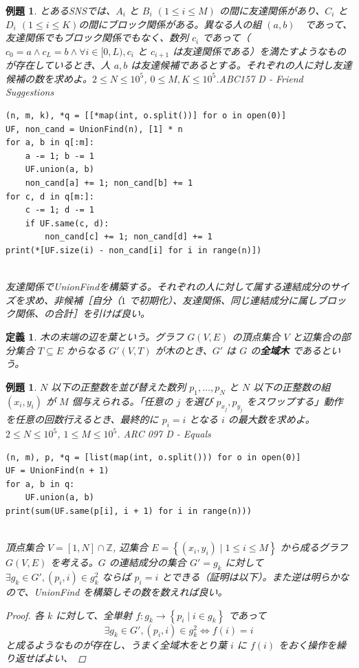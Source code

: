\documentclass[12pt, a4j]{ltjsarticle}
\newtheorem{defi}[thm]{定義}
\newtheorem{exm}[thm]{例題}
\newcommand*{\ZZ}{\mathbb{Z}}
\newcommand*{\SS}{\vspace{1cm}}
\begin{document}
\SS

\begin{exm}\upshape
とあるSNSでは、$A_i$ と $B_i$ $(1\le i\le M)$ の間に友達関係があり、$C_i$ と $D_i$ $(1\le i\le K)$の間にブロック関係がある。異なる人の組 $(a,b)$　であって、友達関係でもブロック関係でもなく、数列 $c_i$ であって（ $c_0 = a \land c_L = b \land \forall i \in [0,L), c_i$ と $c_{i+1}$ は友達関係である）を満たすようなものが存在しているとき、人 $a,b$ は友達候補であるとする。それぞれの人に対し友達候補の数を求めよ。$2\le N\le 10^5$, $0\le M,K\le 10^5$.\quad ABC157 D - Friend Suggestions\\
\begin{lstlisting}[frame = none]
(n, m, k), *q = [[*map(int, o.split())] for o in open(0)]
UF, non_cand = UnionFind(n), [1] * n
for a, b in q[:m]:
    a -= 1; b -= 1
    UF.union(a, b)
    non_cand[a] += 1; non_cand[b] += 1
for c, d in q[m:]:
    c -= 1; d -= 1
    if UF.same(c, d):
        non_cand[c] += 1; non_cand[d] += 1
print(*[UF.size(i) - non_cand[i] for i in range(n)])
\end{lstlisting}\quad\\
友達関係でUnionFindを構築する。それぞれの人に対して属する連結成分のサイズを求め、非候補［自分（$1$ で初期化）、友達関係、同じ連結成分に属しブロック関係、の合計］を引けば良い。
\end{exm}

\newpage

\begin{defi} 木の末端の辺を葉という。グラフ $G(V,E)$ の頂点集合 $V$ と辺集合の部分集合 $T\subseteq E$ からなる $G'(V,T)$ が木のとき、$G'$ は $G$ の{\bf 全域木} であるという。
\end{defi}

\SS

\begin{exm} $N$ 以下の正整数を並び替えた数列 $p_1,\ldots,p_N$ と $N$ 以下の正整数の組 $(x_i,y_i)$ が $M$ 個与えられる。「任意の $j$ を選び $p_{x_j},p_{y_j}$ をスワップする」動作を任意の回数行えるとき、最終的に $p_i=i$ となる $i$ の最大数を求めよ。 $2\le N\le 10^5$, $1\le M\le 10^5$. \quad\upshape ARC 097 D - Equals\\
\begin{lstlisting}
(n, m), p, *q = [list(map(int, o.split())) for o in open(0)]
UF = UnionFind(n + 1)
for a, b in q:
    UF.union(a, b)
print(sum(UF.same(p[i], i + 1) for i in range(n)))
\end{lstlisting}\quad\\
頂点集合 $V=[1,N]\cap\ZZ$, 辺集合 $E=\left\{(x_i,y_i)\mid1\le i\le M\right\}$ から成るグラフ $G(V,E)$ を考える。$G$ の連結成分の集合 $G'={g_k}$ に対して $\exists g_k\in G', (p_i,i) \in g_k^2$ ならば $p_i=i$ とできる（証明は以下）。また逆は明らかなので、UnionFind を構築しその数を数えれば良い。
\begin{proof}
各 $k$ に対して、全単射 $f:g_k \rightarrow \left\{p_i\mid i \in g_k \right\}$ であって
\begin{equation}
\exists g_k\in G', (p_i,i) \in g_k^2 \Longleftrightarrow f(i)=i
\end{equation}
と成るようなものが存在し、うまく全域木をとり葉 $i$ に $f(i)$ をおく操作を繰り返せばよい、
\end{proof}
\end{exm}
\end{document}
